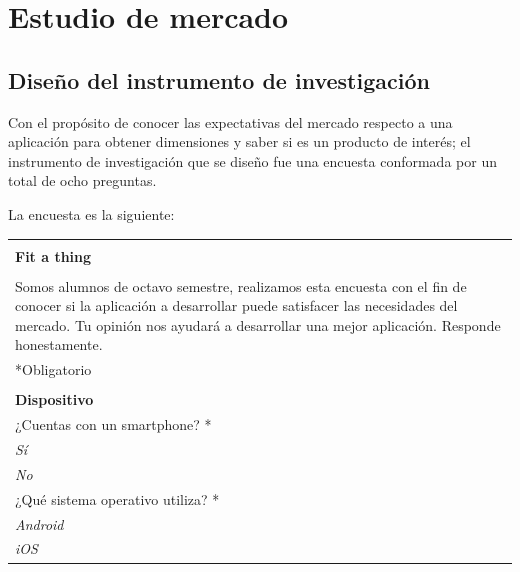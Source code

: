 \section{Estudio de mercado}
\subsection{Diseño del instrumento de investigación}
Con el propósito de conocer las expectativas del mercado respecto a una aplicación para obtener dimensiones y saber si es un producto de interés; el instrumento de investigación que se diseño fue una encuesta conformada  por un total de ocho preguntas.

La encuesta es la siguiente:

\begin{center}
    \begin{tabular}{|p{16cm}|}
        \hline
            \rowcolor[rgb]{0.1,0.1,0.1} \\
            \rowcolor[rgb]{0.1,0.1,0.1} 
            \textbf{\Large{{\color{white}Fit a thing}}} \\[0.3cm]
        \hline
        	 \\
            Somos alumnos de octavo semestre, realizamos esta encuesta con el fin de conocer si la 
            aplicación a desarrollar puede satisfacer las necesidades del mercado. Tu opinión nos ayudará
            a desarrollar una mejor aplicación. Responde honestamente.\\[0.3cm]
             \textcolor{rojo}{*Obligatorio}\\[0.3cm]
        \hline
            \rowcolor[rgb]{0.8,0.8,0.8}\\
            \rowcolor[rgb]{0.8,0.8,0.8}
            \textbf{\color{darkgray}Dispositivo} \\ [0.3cm]
        \hline
            ¿Cuentas con un smartphone? \textcolor{rojo}{*}\\
            \hspace{1cm}\textit{Sí}\\
            \hspace{1cm}\textit{No}\\
            \hline
             ¿Qué sistema operativo utiliza? \textcolor{rojo}{*}\\
            \hspace{1cm}\textit{Android}\\
            \hspace{1cm}\textit{iOS}\\

\end{tabular}
\end{center}
